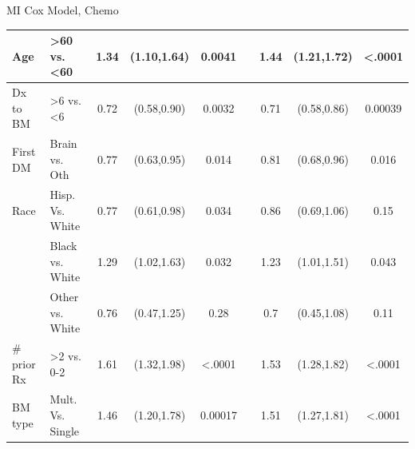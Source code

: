 \begin{frame}{MI Cox Model, Chemo}
\begin{table}[]
{\begin{tabular}{|l|l|c|c|c|c|c|c|c|}
Age                            & \textgreater 60 vs. \textless 60 & 1.34                                                & (1.10,1.64)           & 0.0041                &                       & 1.44                  & (1.21,1.72) & \textless .0001                                             \\ \hline
Dx to BM                       & \textgreater 6 vs. \textless 6   & 0.72                                                & (0.58,0.90)           & 0.0032                &                       & 0.71                  & (0.58,0.86) & 0.00039                                                     \\ \hline
First DM                       & Brain vs. Oth                    & 0.77                                                & (0.63,0.95)           & 0.014                 &                       & 0.81                  & (0.68,0.96) & 0.016                                                       \\ \hline
Race                           & Hisp. Vs. White                  & 0.77                                                & (0.61,0.98)           & 0.034                 &                       & 0.86                  & (0.69,1.06) & 0.15                                                        \\ \hline
                               & Black vs. White                  & 1.29                                                & (1.02,1.63)           & 0.032                 &                       & 1.23                  & (1.01,1.51) & 0.043                                                       \\ \hline
                               & Other vs. White                  & 0.76                                                & (0.47,1.25)           & 0.28                  &                       & 0.7                   & (0.45,1.08) & 0.11                                                        \\ \hline
\# prior Rx                    & \textgreater2 vs. 0-2            & 1.61                                                & (1.32,1.98)           & \textless .0001       &                       & 1.53                  & (1.28,1.82) & \textless .0001                                             \\ \hline
BM type                        & Mult. Vs. Single                 & 1.46                                                & (1.20,1.78)           & 0.00017               &                       & 1.51                  & (1.27,1.81) & \textless .0001                                             \\ \hline

\end{tabular}}
\end{table}
\end{frame}
